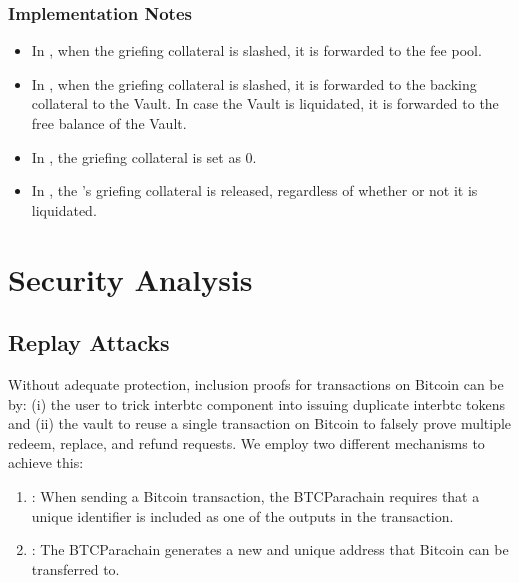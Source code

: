 \documentclass[a4paper,10pt,english]{sphinxmanual}
\begin{document}
\subsection{Implementation Notes}
\label{\detokenize{security_performance/liquidations:implementation-notes}}\begin{itemize}
\item {} 
In , when the griefing collateral is slashed, it is forwarded to the fee pool.

\item {} 
In , when the griefing collateral is slashed, it is forwarded to the backing collateral to the Vault. In case the Vault is liquidated, it is forwarded to the free balance of the Vault.

\item {} 
In , the griefing collateral is set as 0.

\item {} 
In , the ’s griefing collateral is released, regardless of whether or not it is liquidated.

\end{itemize}


\chapter{Security Analysis}
\label{\detokenize{security_performance/security-analysis:security-analysis}}\label{\detokenize{security_performance/security-analysis:id1}}\label{\detokenize{security_performance/security-analysis::doc}}

\section{Replay Attacks}
\label{\detokenize{security_performance/security-analysis:replay-attacks}}
Without adequate protection, inclusion proofs for transactions on Bitcoin can be  by: (i) the user to trick interbtc component into issuing duplicate interbtc tokens and (ii) the vault to reuse a single transaction on Bitcoin to falsely prove multiple redeem, replace, and refund requests.
We employ two different mechanisms to achieve this:
\begin{enumerate}
%
\item {} 
: When sending a Bitcoin transaction, the BTC\sphinxhyphen{}Parachain requires that a unique identifier is included as one of the outputs in the transaction.

\item {} 
: The BTC\sphinxhyphen{}Parachain generates a new and unique address that Bitcoin can be transferred to.

\end{enumerate}
\end{document}
